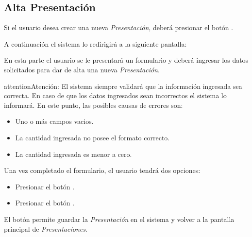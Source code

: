 \documentclass[a4paper,10pt,spanish]{sphinxmanual}
\begin{document}
\subsection{Alta Presentación}
\label{presentaciones:alta-presentacion}\label{presentaciones:id1}
Si el usuario desea crear una nueva \emph{Presentación}, deberá presionar el botón .


A continuación el sistema lo redirigirá a la siguiente pantalla:


En esta parte el usuario se le presentará un formulario y deberá ingresar los datos solicitados para dar de alta una nueva \emph{Presentación}.

\begin{notice}{attention}{Atención:}
El sistema siempre validará que la información ingresada sea correcta. En caso de que los datos ingresados sean incorrectos el sistema lo informará.
En este punto, las posibles causas de errores son:
\begin{itemize}
\item {} 
Uno o más campos vacios.

\item {} 
La cantidad ingresada no posee el formato correcto.

\item {} 
La cantidad ingresada es menor a cero.

\end{itemize}
\end{notice}

Una vez completado el formulario, el usuario tendrá dos opciones:
\begin{itemize}
\item {} 
Presionar el botón .

\item {} 
Presionar el botón .

\end{itemize}

El botón  permite guardar la \emph{Presentación} en el sistema y volver a la pantalla
principal de \emph{Presentaciones}.
\end{document}
